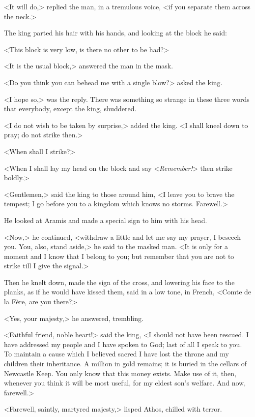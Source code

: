 <It will do,> replied the man, in a tremulous voice, <if you separate them across the neck.>

The king parted his hair with his hands, and looking at the block he said:

<This block is very low, is there no other to be had?>

<It is the usual block,> answered the man in the mask.

<Do you think you can behead me with a single blow?> asked the king.

<I hope so,> was the reply. There was something so strange in these three words that everybody, except the king, shuddered.

<I do not wish to be taken by surprise,> added the king. <I shall kneel down to pray; do not strike then.>

<When shall I strike?>

<When I shall lay my head on the block and say <\textit{Remember!}> then strike boldly.>

<Gentlemen,> said the king to those around him, <I leave you to brave the tempest; I go before you to a kingdom which knows no storms. Farewell.>

He looked at Aramis and made a special sign to him with his head.

<Now,> he continued, <withdraw a little and let me say my prayer, I beseech you. You, also, stand aside,> he said to the masked man. <It is only for a moment and I know that I belong to you; but remember that you are not to strike till I give the signal.>

Then he knelt down, made the sign of the cross, and lowering his face to the planks, as if he would have kissed them, said in a low tone, in French, <Comte de la Fère, are you there?>

<Yes, your majesty,> he answered, trembling.

<Faithful friend, noble heart!> said the king, <I should not have been rescued. I have addressed my people and I have spoken to God; last of all I speak to you. To maintain a cause which I believed sacred I have lost the throne and my children their inheritance. A million in gold remains; it is buried in the cellars of Newcastle Keep. You only know that this money exists. Make use of it, then, whenever you think it will be most useful, for my eldest son's welfare. And now, farewell.>

<Farewell, saintly, martyred majesty,> lisped Athos, chilled with terror.

